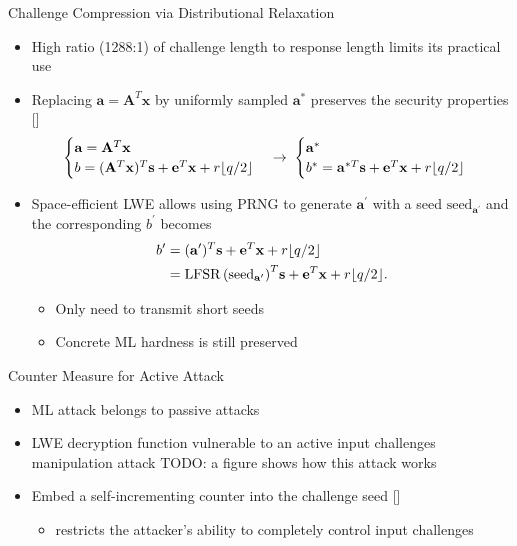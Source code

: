\begin{frame}{Challenge Compression via Distributional Relaxation}
\begin{itemize}
    \item  High ratio (1288:1) of challenge length to response length limits its practical use 
    \item Replacing $\mathbf{a}=\mathbf{A}^T\mathbf{x}$ by uniformly sampled $\mathbf{a}^*$ preserves the security properties []
 \begin{equation*}
    \begin{cases}
    \mathbf{a}= \mathbf{A}^T\mathbf{x}\\
    b = (\mathbf{A}^T\mathbf{x})^T\mathbf{s}+\mathbf{e}^T\mathbf{x}+r\lfloor q/2\rfloor
    \end{cases}\rightarrow\;
    \begin{cases}
    \mathbf{a}^*\\
    b^*=\mathbf{a}^{*T}\mathbf{s}+\mathbf{e}^T\mathbf{x}+r\lfloor q/2\rfloor
    \end{cases}
\end{equation*}   
\item Space-efficient LWE allows using PRNG to generate $\mathbf{a}^\prime$ with a seed $\text{seed}_{\mathbf{a}^\prime}$ and the corresponding $b^\prime$ becomes
\begin{align*}
    b^\prime&=(\mathbf{a}^\prime)^T\mathbf{s}+\mathbf{e}^T\mathbf{x}+r\floor{q/2}\\
    &= \LFSR{(\text{seed}_{\mathbf{a}^\prime})}^T\mathbf{s}+\mathbf{e}^T\mathbf{x}+r\floor{q/2}.
\end{align*}
    \begin{itemize}
        \item Only need to transmit short seeds
        \item Concrete ML hardness is still preserved
    \end{itemize}
\end{itemize}
\end{frame}

\begin{frame}{Counter Measure for Active Attack}
\begin{itemize}
    \item ML attack belongs to passive attacks
    \item LWE decryption function vulnerable to an active input challenges manipulation attack
    TODO: a figure shows how this attack works
    \item Embed a self-incrementing counter into the challenge seed []
    \begin{itemize}
        \item  restricts the attacker’s ability to completely control input challenges
    \end{itemize}
\end{itemize}
\end{frame}

